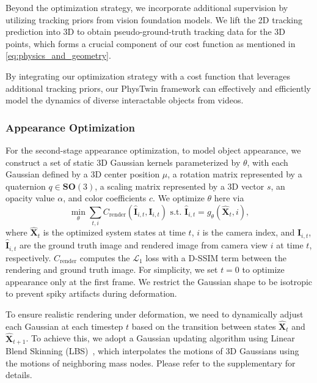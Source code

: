 Beyond the optimization strategy, we incorporate additional supervision by utilizing tracking priors from vision foundation models. We lift the 2D tracking prediction into 3D to obtain pseudo-ground-truth tracking data for the 3D points, which forms a crucial component of our cost function as mentioned in \cref{eq:physics_and_geometry}.

By integrating our optimization strategy with a cost function that leverages additional tracking priors, our PhysTwin framework can effectively and efficiently model the dynamics of diverse interactable objects from videos.

\subsubsection{Appearance Optimization}
\label{sec:gaussians}

For the second-stage appearance optimization, to model object appearance, we construct a set of static 3D Gaussian kernels parameterized by $\theta$, with each Gaussian defined by a 3D center position $\mu$, a rotation matrix represented by a quaternion $q \in \textbf{SO}(3)$, a scaling matrix represented by a 3D vector $s$, an opacity value $\alpha$, and color coefficients $c$. We optimize $\theta$ here via \begin{equation}
\label{eq:splats}
    \min_\theta \sum_{t, i} C_{\mathrm{render}}(\hat{\mathbf{I}}_{i, t}, \mathbf{I}_{i, t}) \text{\ s.t. } \hat{\mathbf{I}}_{i, t} = g_{\theta}(\hat{\mathbf{X}}_{t}, i),
\end{equation} where $\hat{\mathbf{X}}_{t}$ is the optimized system states at time $t$, $i$ is the camera index, and $\mathbf{I}_{i, t}$, $\hat{\mathbf{I}}_{i, t}$ are the ground truth image and rendered image from camera view $i$ at time $t$, respectively. $C_{\mathrm{render}}$ computes the $\mathcal{L}_1$ loss with a D-SSIM term between the rendering and ground truth image. For simplicity, we set $t=0$ to optimize appearance only at the first frame. We restrict the Gaussian shape to be isotropic to prevent spiky artifacts during deformation.

To ensure realistic rendering under deformation, we need to dynamically adjust each Gaussian at each timestep $t$ based on the transition between states $\hat{\mathbf{X}}_{t}$ and $\hat{\mathbf{X}}_{t+1}$. To achieve this, we adopt a Gaussian updating algorithm using Linear Blend Skinning (LBS)~\cite{sumner2007embedded, zhang2024dynamic, huang2024sc}, which interpolates the motions of 3D Gaussians using the motions of neighboring mass nodes. Please refer to the supplementary for details. 


